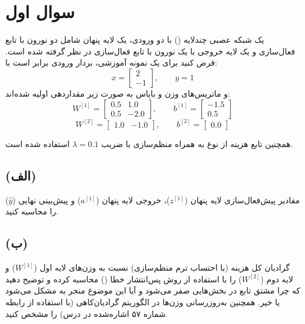 \documentclass{article}
\begin{document}


\tableofcontents \clearpage
\listoffigures \clearpage
\listoftables \clearpage
\lstlistoflistings \clearpage
\newpage

\section{سوال اول}


یک شبکه عصبی چندلایه () با دو ورودی، یک لایه پنهان شامل دو نورون با تابع فعال‌سازی  و یک لایه خروجی با یک نورون با تابع فعال‌سازی  در نظر گرفته شده است. فرض کنید برای یک نمونه آموزشی، بردار ورودی برابر است با:
\[
x =
\begin{bmatrix}
	2 \\ -1
\end{bmatrix},
\qquad
y = 1
\]
و ماتریس‌های وزن و بایاس به صورت زیر مقداردهی اولیه شده‌اند:
\[
W^{[1]}=
\begin{bmatrix}
	0.5 & 1.0 \\
	0.5 & -2.0
\end{bmatrix},
\qquad
b^{[1]}=
\begin{bmatrix}
	-1.5 \\
	0.5
\end{bmatrix}
\]
\[
W^{[2]}=
\begin{bmatrix}
	1.0 & -1.0
\end{bmatrix},
\qquad
b^{[2]}=
\begin{bmatrix}
	0.0
\end{bmatrix}
\]

همچنین تابع هزینه از نوع  به همراه منظم‌سازی  با ضریب \(\lambda = 0.1\) استفاده شده است.

\subsection*{(الف)}
مقادیر پیش‌فعال‌سازی لایه پنهان (\(z^{[1]}\))، خروجی لایه پنهان (\(a^{[1]}\)) و پیش‌بینی نهایی (\(\hat{y}\)) را محاسبه کنید.

\subsection*{(ب)}
گرادیان کل هزینه (با احتساب ترم منظم‌سازی) نسبت به وزن‌های لایه اول (\(W^{[1]}\)) و لایه دوم (\(W^{[2]}\)) را با استفاده از روش پس‌انتشار خطا () محاسبه کرده و توضیح دهید که چرا مشتق تابع  در بخش‌هایی صفر می‌شود و آیا این موضوع منجر به مشکل  می‌شود یا خیر. همچنین به‌روزرسانی وزن‌ها در الگوریتم گرادیان‌کاهی (با استفاده از رابطه شماره ۵۷ اشاره‌شده در درس) را مشخص کنید.
\end{document}
